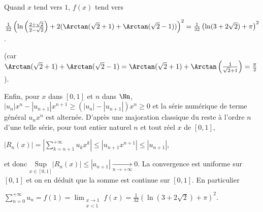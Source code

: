 {{Quand $x$ tend vers $1$, $f(x)$ tend vers 

\begin{center}
$\frac{1}{32}
\left(\ln\left(\frac{2+\sqrt{2}}{2-\sqrt{2}}\right)+ 2 (\Arctan (\sqrt{2}+1)+\Arctan(\sqrt{2}-1))\right)^2=  \frac{1}{32}\left(\ln(3+2\sqrt{2}) +\pi\right)^2$.
\end{center}

(car $\Arctan (\sqrt{2}+1)+\Arctan(\sqrt{2}-1)=\Arctan (\sqrt{2}+1)+\Arctan\left(\frac{1}{\sqrt{2}+1}\right)=\frac{\pi}{2}$).

Enfin, pour $x$ dans $[0,1]$ et $n$ dans $\Nn$, $|u_n|x^n - |u_{n+1}|x^{n+1}\geqslant(|u_n| - |u_{n+1}|)x^n\geqslant 0$ et la série numérique de terme général $u_nx^n$ est alternée. D'après une majoration classique du reste à l'ordre $n$ d'une telle série, pour tout entier naturel $n$ et tout réel $x$ de $[0,1]$,

\begin{center}
$|R_n(x)|=\left|\sum_{k=n+1}^{+\infty}u_kx^k\right|\leqslant\left|u_{n+1}x^{n+1}\right|\leqslant |u_{n+1}|$,
\end{center}

et donc $\underset{x\in[0,1]}{\text{Sup}}|R_n(x)|\leqslant|a_{n+1}|\underset{n\rightarrow+\infty}{\rightarrow}0$. La convergence est uniforme sur $[0,1]$ et on en déduit que la somme est continue sur $[0,1]$. En particulier 

\begin{center}
$\sum_{n=0}^{+\infty}u_n=f(1)=\displaystyle\lim_{\substack{x\rightarrow1\\ x<1}}f(x)=\frac{1}{32}\left(\ln(3+2\sqrt{2}) +\pi\right)^2$.
\end{center}

\begin{center}
\end{center}
}
}
